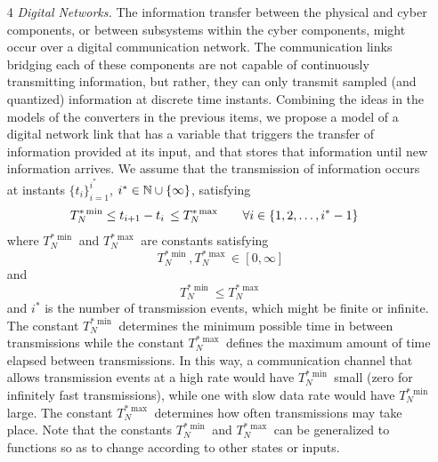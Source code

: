 \documentclass{article}
\begin{document}
\begin{enumerate}
\item[4] {\em Digital Networks.}
The information transfer between the physical and cyber components, or between 
subsystems within the cyber components, might occur over a digital communication network.  
The communication links bridging each of these components
are not capable of continuously transmitting information, but rather,
they can only transmit sampled (and quantized) information at discrete time instants.
Combining the ideas in the models of the converters in the previous items, 
we propose a model of a  digital network link that has a variable that 
triggers the transfer of information provided at its input, and that
stores that information until new information arrives.
We assume that the transmission of information occurs at instants 
$\{t_i\}_{i=1}^{i^*}$, $i^* \in \mathbb{N}\cup \{\infty\}$, satisfying
\begin{eqnarray}\nonumber
T^{*\min}_{N} & \leq t_{i+1}-t_i\,\leq T^{*\max}_{N}\qquad \forall i\in \{1,2,\ldots, i^*-1\}
\end{eqnarray}
where $T^{*\min}_{N}$ and $T^{*\max}_{N}$ are constants satisfying  $$T^{*\min}_{N}, T^{*\max}_{N} \in [0,\infty]$$
and $$T^{*\min}_{N} \leq T^{*\max}_{N}$$ and $i^*$ is the number of transmission events, which might be finite or infinite.
The constant $T^{*\min}_{N}$ determines the minimum possible time in between 
transmissions while the constant $T^{*\max}_{N}$ defines the maximum amount of time elapsed between transmissions.
In this way, a communication channel that allows transmission events at a high rate
would have $T^{*\min}_{N}$ small (zero for infinitely fast transmissions), 
while one with slow data rate would have $T^{*\min}_{N}$ large.
The constant $T^{*\max}_{N}$ determines
how often transmissions may take place.
Note that the constants $T^{*\min}_{N}$ and $T^{*\max}_{N}$ can be
generalized to functions so as to change according to other states or inputs.


\end{enumerate}
\end{document}
